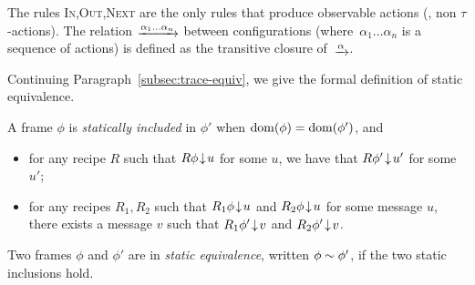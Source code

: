 The rules \textsc{In,Out,Next} are the only rules that produce observable
actions (\ie, non $\tau$-actions).
%
The relation $\lrstep{\alpha_1 \ldots \alpha_n}$ between
configurations (where~$\alpha_1 \ldots \alpha_n$ is a sequence of actions) 
is defined as the transitive closure of~$\lrstep{\alpha}$. 






\label{ap:model:eint}


Continuing Paragraph~\ref{subsec:trace-equiv}, we give the formal definition of static equivalence.

\begin{definition}%
A frame $\phi$ is \emph{statically included} in $\phi'$
when $\mathrm{dom}(\phi) = \mathrm{dom}(\phi')$, and
\begin{itemize}
\item for any recipe $R$
  such that $R\phi \!\downarrow\! u$ for some $u$,
 we have that $R\phi'\!\downarrow\! u'$ for some $u'$;
\item for any recipes $R_1,R_2$ such that
  $R_1\phi\!\downarrow\! u$ and $R_2\phi\!\downarrow\! u$ for some message $u$,
  there exists a message $v$ such that $R_1\phi'\!\downarrow\! v$ and
  $R_2\phi'\!\downarrow\! v$.
\end{itemize}
Two frames $\phi$ and $\phi'$ are in \emph{static equivalence},
written $\phi \sim \phi'$, if the two static inclusions hold.
\end{definition}


